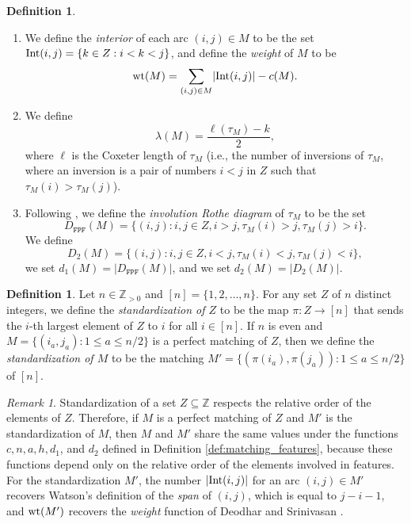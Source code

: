 \documentclass[11pt]{amsart}
\theoremstyle{plain}
\theoremstyle{definition}
\newtheorem{defn}[theorem]{Definition}
\theoremstyle{remark}
\newtheorem{rmk}[theorem]{Remark}
\numberwithin{equation}{section}
\newcommand{\Z}{{\mathbb Z}}
\newcommand{\ra}{\rightarrow}
\DeclareMathOperator{\wt}{\rm{wt}}
\DeclareMathOperator{\interior}{\rm{Int}}
\newcommand{\se}{\subseteq}
\newcommand{\abs}[1]{\lvert #1 \rvert}
\begin{document}
\begin{defn}
\begin{enumerate}
\item We define the \emph{interior} of each arc $(i,j)\in M$ to be the set 
  $\interior(i,j)=\{k\in Z: i<k<j\}$, and define the \emph{weight} of $M$ to be
  \begin{equation} \label{eq:wt} 
    \wt(M)=\sum_{(i,j)\in M} \abs{\interior(i,j)}-c(M).
  \end{equation}

\item We define 
  \[
    \lambda(M)=\frac{\ell(\tau_M)-k}{2},
  \]
  where $\ell$ is the Coxeter length of $\tau_M$ (i.e., the number of inversions
  of $\tau_M$, where an inversion is a pair of numbers $i<j$ in $Z$ such that
  $\tau_M(i)>\tau_M(j)$). 
  

\item Following \cite{hamaker18}, we define
  the \emph{involution Rothe diagram} of $\tau_M$ to be
  the set
  \[
    D_\texttt{FPF}(M)=\{(i,j) : i,j\in Z, i>j, \tau_M(i)>j, \tau_M(j)>i\}.
  \]
  We define 
  \[ 
  D_2(M)=\{(i,j) : i,j\in Z, i<j, \tau_M(i)<j, \tau_M(j)<i\},
  \]
  we set $d_1(M)=\abs{D_\texttt{FPF}(M)}$, and we set $d_2(M)=\abs{D_2(M)}$.
\end{enumerate}
\end{defn}


\begin{defn}
\label{defn:standardize}
Let $n\in \Z_{>0}$ and $[n]=\{1,2,\dots ,n\}$. For any set $Z$ of $n$ distinct
integers, we define the \emph{standardization of $Z$} to be the map $\pi: Z\ra
[n]$ that sends the $i$-th largest element of $Z$ to $i$ for all $i\in [n]$. If
$n$ is even and $M=\{(i_a,j_a): 1\le a\le n/2\}$ is a perfect matching of $Z$,
then we define the \emph{standardization of $M$} to be the matching
$M'=\{(\pi(i_a),\pi(j_a)):1\le a\le n/2\}$ of $[n]$. \end{defn}

\begin{rmk}
\label{rmk:standardize}
Standardization of a set $Z\se \Z$ respects the relative order of 
the elements of $Z$. Therefore, if $M$ 
is a perfect matching of $Z$ and 
$M'$ is the standardization of $M$, then $M$ and $M'$ share the
same values under the functions $c,n,a,h, d_1$, and $d_2$ defined in Definition
\ref{def:matching_features}, because these functions depend only on the relative order of the elements involved in features. For
the standardization $M'$, the number $\abs{\interior(i,j)}$ for an arc $(i,j)\in
M'$ recovers Watson's definition of the \emph{span} of $(i,j)$, which is equal
to $j-i-1$, and $\wt(M')$ recovers the \emph{weight} function of Deodhar and
Srinivasan \cite{deodhar}. 
\end{rmk}
\end{document}
